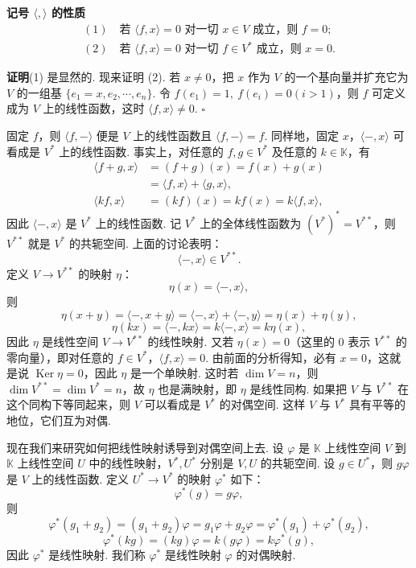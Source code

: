 \documentclass[UTF8,12pt,a4paper,fontset=fandol]{ctexart}
\begin{document}
\noindent\textbf{记号 $\langle,\rangle$ 的性质}
\[
\begin{gathered}
  (1)\quad \text{若 }\langle f,x\rangle=0\text{ 对一切 }x\in V\text{ 成立，则 }f=0;\\
  (2)\quad \text{若 }\langle f,x\rangle=0\text{ 对一切 }f\in V^*\text{ 成立，则 }x=0.
\end{gathered}
\]

\noindent\textbf{证明}\quad (1) 是显然的. 现来证明 (2). 若 $x\ne0$，把 $x$ 作为 $V$ 的一个基向量并扩充它为 $V$ 的一组基 $\{e_1=x,e_2,\cdots,e_n\}$. 令 $f(e_1)=1,\ f(e_i)=0(i>1)$，则 $f$ 可定义成为 $V$ 上的线性函数，这时 $\langle f,x\rangle\ne0$. $\square$

固定 $f$，则 $\langle f,-\rangle$ 便是 $V$ 上的线性函数且 $\langle f,-\rangle=f$. 同样地，固定 $x$，$\langle-,x\rangle$ 可看成是 $V^*$ 上的线性函数. 事实上，对任意的 $f,g\in V^*$ 及任意的 $k\in\mathbb K$，有
\[
\begin{aligned}
  \langle f+g,x\rangle&=(f+g)(x)=f(x)+g(x)\\
  &=\langle f,x\rangle+\langle g,x\rangle,\\
  \langle kf,x\rangle&=(kf)(x)=kf(x)=k\langle f,x\rangle,
\end{aligned}
\]
因此 $\langle-,x\rangle$ 是 $V^*$ 上的线性函数. 记 $V^*$ 上的全体线性函数为 $(V^*)^*=V^{**}$，则 $V^{**}$ 就是 $V^*$ 的共轭空间. 上面的讨论表明：
\[
  \langle-,x\rangle\in V^{**}.
\]
定义 $V\to V^{**}$ 的映射 $\eta$：
\[
  \eta(x)=\langle-,x\rangle,
\]
则
\[
  \eta(x+y)=\langle-,x+y\rangle=\langle-,x\rangle+\langle-,y\rangle=\eta(x)+\eta(y),
\]
\[
  \eta(kx)=\langle-,kx\rangle=k\langle-,x\rangle=k\eta(x),
\]
因此 $\eta$ 是线性空间 $V\to V^{**}$ 的线性映射. 又若 $\eta(x)=0$（这里的 0 表示 $V^{**}$ 的零向量），即对任意的 $f\in V^*$，$\langle f,x\rangle=0$. 由前面的分析得知，必有 $x=0$，这就是说 $\operatorname{Ker}\eta=0$，因此 $\eta$ 是一个单映射. 这时若 $\dim V=n$，则 $\dim V^{**}=\dim V^*=n$，故 $\eta$ 也是满映射，即 $\eta$ 是线性同构. 如果把 $V$ 与 $V^{**}$ 在这个同构下等同起来，则 $V$ 可以看成是 $V^*$ 的对偶空间. 这样 $V$ 与 $V^*$ 具有平等的地位，它们互为对偶.

现在我们来研究如何把线性映射诱导到对偶空间上去. 设 $\varphi$ 是 $\mathbb K$ 上线性空间 $V$ 到 $\mathbb K$ 上线性空间 $U$ 中的线性映射，$V^*,U^*$ 分别是 $V,U$ 的共轭空间. 设 $g\in U^*$，则 $g\varphi$ 是 $V$ 上的线性函数. 定义 $U^*\to V^*$ 的映射 $\varphi^*$ 如下：
\[
  \varphi^*(g)=g\varphi,
\]
则
\[
  \varphi^*(g_1+g_2)=(g_1+g_2)\varphi=g_1\varphi+g_2\varphi=\varphi^*(g_1)+\varphi^*(g_2),
\]
\[
  \varphi^*(kg)=(kg)\varphi=k(g\varphi)=k\varphi^*(g),
\]
因此 $\varphi^*$ 是线性映射. 我们称 $\varphi^*$ 是线性映射 $\varphi$ 的对偶映射.
\end{document}
